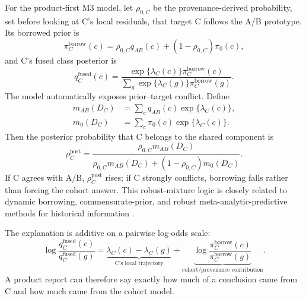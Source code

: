 \documentclass[11pt]{article}
\begin{document}
    For the product-first M3 model, let $\rho_{0,C}$ be the provenance-derived probability,
    set before looking at C's local residuals, that target C follows the A/B prototype. Its
    borrowed prior is
    \begin{equation}
        \pi_C^{\mathrm{borrow}}(c)
        =\rho_{0,C}q_{AB}(c)+(1-\rho_{0,C})\pi_0(c),
        \label{eq:cohort-mixture-prior}
    \end{equation}
    and C's fused class posterior is
    \begin{equation}
        q_C^{\mathrm{fused}}(c)
        =\frac{\exp\{\lambda_C(c)\}\pi_C^{\mathrm{borrow}}(c)}
        {\sum_g\exp\{\lambda_C(g)\}\pi_C^{\mathrm{borrow}}(g)}.
        \label{eq:cohort-fused-posterior}
    \end{equation}
    The model automatically exposes prior--target conflict. Define
    \begin{equation}
        \begin{aligned}
            m_{AB}(D_C)&=\sum_c q_{AB}(c)\exp\{\lambda_C(c)\},\\
            m_0(D_C)&=\sum_c \pi_0(c)\exp\{\lambda_C(c)\}.
        \end{aligned}
    \end{equation}
    Then the posterior probability that C belongs to the shared component is
    \begin{equation}
        \rho_C^{\mathrm{post}}
        =\frac{\rho_{0,C}m_{AB}(D_C)}
        {\rho_{0,C}m_{AB}(D_C)+(1-\rho_{0,C})m_0(D_C)}.
        \label{eq:cohort-posterior-sharedness}
    \end{equation}
    If C agrees with A/B, $\rho_C^{\mathrm{post}}$ rises; if C strongly conflicts, borrowing
    falls rather than forcing the cohort answer. This robust-mixture logic is closely related
    to dynamic borrowing, commensurate-prior, and robust meta-analytic-predictive methods for
    historical information \cite{ibrahim2000,hobbs2011,schmidli2014,yang2023}.

    The explanation is additive on a pairwise log-odds scale:
    \begin{equation}
        \log\frac{q_C^{\mathrm{fused}}(c)}{q_C^{\mathrm{fused}}(g)}
        =\underbrace{\lambda_C(c)-\lambda_C(g)}_{\text{C's local trajectory}}
        +\underbrace{\log\frac{\pi_C^{\mathrm{borrow}}(c)}
        {\pi_C^{\mathrm{borrow}}(g)}}_{\text{cohort/provenance contribution}}.
        \label{eq:cohort-log-odds-explanation}
    \end{equation}
    A product report can therefore say exactly how much of a conclusion came from C and how
    much came from the cohort model.
\end{document}
